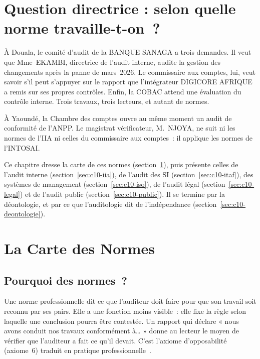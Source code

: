 \bigskip

\section*{Question directrice : selon quelle norme travaille-t-on~?}

À Douala, le comité d'audit de la BANQUE SANAGA a trois demandes. Il veut
que Mme~EKAMBI, directrice de l'audit interne, audite la gestion des
changements après la panne de mars~2026. Le commissaire aux comptes, lui,
veut savoir s'il peut s'appuyer sur le rapport que l'intégrateur DIGICORE
AFRIQUE a remis sur ses propres contrôles. Enfin, la COBAC attend une
évaluation du contrôle interne. Trois travaux, trois lecteurs, et autant
de normes.

À Yaoundé, la Chambre des comptes ouvre au même moment un audit de
conformité de l'ANPP. Le magistrat vérificateur, M.~NJOYA, ne suit ni les
normes de l'IIA ni celles du commissaire aux comptes~: il applique les
normes de l'INTOSAI.

Ce chapitre dresse la carte de ces normes (section~\ref{sec:c10-carte}),
puis présente celles de l'audit interne (section~\ref{sec:c10-iia}), de
l'audit des SI (section~\ref{sec:c10-itaf}), des systèmes de management
(section~\ref{sec:c10-iso}), de l'audit légal (section~\ref{sec:c10-legal})
et de l'audit public (section~\ref{sec:c10-public}). Il se termine par la
déontologie, et par ce que l'auditologie dit de l'indépendance
(section~\ref{sec:c10-deontologie}).

\separateur

\section{La Carte des Normes}
\label{sec:c10-carte}

\subsection{Pourquoi des normes~?}

Une norme professionnelle dit ce que l'auditeur doit faire pour que son
travail soit reconnu par ses pairs. Elle a une fonction moins visible~:
elle fixe la règle selon laquelle une conclusion pourra être contestée.
Un rapport qui déclare « nous avons conduit nos travaux conformément
à… » donne au lecteur le moyen de vérifier que l'auditeur a fait ce qu'il
devait. C'est l'axiome d'opposabilité (axiome~6) traduit en pratique
professionnelle~\cite{minka2026auditologie}.

